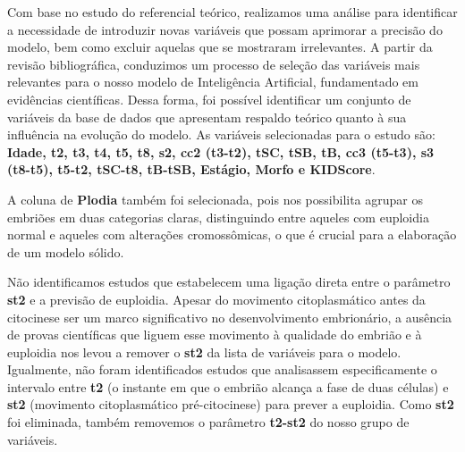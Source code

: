 
Com base no estudo do referencial teórico, realizamos uma análise para identificar a necessidade de introduzir novas variáveis que possam aprimorar a precisão do modelo, bem como excluir aquelas que se mostraram irrelevantes. A partir da revisão bibliográfica, conduzimos um processo de seleção das variáveis mais relevantes para o nosso modelo de Inteligência Artificial, fundamentado em evidências científicas. Dessa forma, foi possível identificar um conjunto de variáveis da base de dados que apresentam respaldo teórico quanto à sua influência na evolução do modelo. As variáveis selecionadas para o estudo são: \textbf{Idade, t2, t3, t4, t5, t8, s2, cc2 (t3-t2), tSC, tSB, tB, cc3 (t5-t3), s3 (t8-t5), t5-t2, tSC-t8, tB-tSB, Estágio, Morfo e KIDScore}.

A coluna de \textbf{Plodia} também foi selecionada, pois nos possibilita agrupar os embriões em duas categorias claras, distinguindo entre aqueles com euploidia normal e aqueles com alterações cromossômicas, o que é crucial para a elaboração de um modelo sólido.

Não identificamos estudos que estabelecem uma ligação direta entre o parâmetro \textbf{st2} e a previsão de euploidia. Apesar do movimento citoplasmático antes da citocinese ser um marco significativo no desenvolvimento embrionário, a ausência de provas científicas que liguem esse movimento à qualidade do embrião e à euploidia nos levou a remover o \textbf{st2} da lista de variáveis para o modelo. Igualmente, não foram identificados estudos que analisassem especificamente o intervalo entre \textbf{t2} (o instante em que o embrião alcança a fase de duas células) e \textbf{st2} (movimento citoplasmático pré-citocinese) para prever a euploidia. Como \textbf{st2} foi eliminada, também removemos o parâmetro \textbf{t2-st2} do nosso grupo de variáveis.

